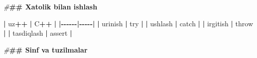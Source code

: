 \documentclass[a4paper,11pt,twoside,openright]{book}
\newenvironment{Shaded}{\begin{snugshade}}{\end{snugshade}}
\newcommand{\ErrorTok}[1]{\textcolor[rgb]{0.64,0.00,0.00}{\textbf{#1}}}
\newcommand{\NormalTok}[1]{#1}
\newcommand{\OperatorTok}[1]{\textcolor[rgb]{0.81,0.36,0.00}{\textbf{#1}}}
\newcommand{\PreprocessorTok}[1]{\textcolor[rgb]{0.56,0.35,0.01}{\textit{#1}}}
\begin{document}
\begin{Shaded}
\begin{Highlighting}[]
\PreprocessorTok{\#}\ErrorTok{\#\# Xatolik bilan ishlash}

\OperatorTok{|}\NormalTok{ uz}\OperatorTok{++} \OperatorTok{|}\NormalTok{ C}\OperatorTok{++} \OperatorTok{|}
\OperatorTok{|{-}{-}{-}{-}{-}{-}|{-}{-}{-}{-}{-}|}
\OperatorTok{|} \ErrorTok{\textasciigrave{}}\NormalTok{urinish}\ErrorTok{\textasciigrave{}} \OperatorTok{|} \ErrorTok{\textasciigrave{}}\NormalTok{try}\ErrorTok{\textasciigrave{}} \OperatorTok{|}
\OperatorTok{|} \ErrorTok{\textasciigrave{}}\NormalTok{ushlash}\ErrorTok{\textasciigrave{}} \OperatorTok{|} \ErrorTok{\textasciigrave{}}\NormalTok{catch}\ErrorTok{\textasciigrave{}} \OperatorTok{|}
\OperatorTok{|} \ErrorTok{\textasciigrave{}}\NormalTok{irgitish}\ErrorTok{\textasciigrave{}} \OperatorTok{|} \ErrorTok{\textasciigrave{}}\NormalTok{throw}\ErrorTok{\textasciigrave{}} \OperatorTok{|}
\OperatorTok{|} \ErrorTok{\textasciigrave{}}\NormalTok{tasdiqlash}\ErrorTok{\textasciigrave{}} \OperatorTok{|} \ErrorTok{\textasciigrave{}}\NormalTok{assert}\ErrorTok{\textasciigrave{}} \OperatorTok{|}

\PreprocessorTok{\#}\ErrorTok{\#\# Sinf va tuzilmalar}


\end{Highlighting}
\end{Shaded}
\end{document}
